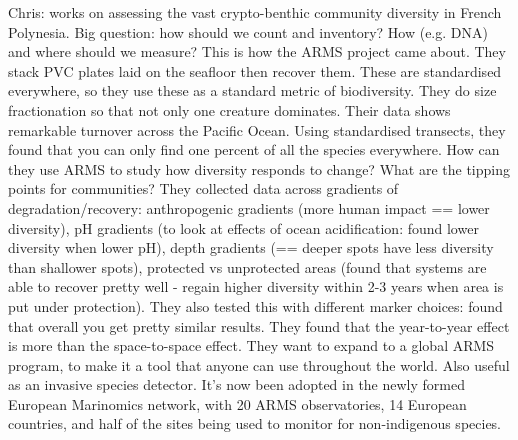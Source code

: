\documentclass[9pt]{article}
\begin{document}
	Chris: works on assessing the vast crypto-benthic community diversity in French Polynesia. Big question: how should we count and inventory? How (e.g. DNA) and where should we measure? This is how the ARMS project came about. They stack PVC plates laid on the seafloor then recover them. These are standardised everywhere, so they use these as a standard metric of biodiversity. They do size fractionation so that not only one creature dominates. Their data shows remarkable turnover across the Pacific Ocean. Using standardised transects, they found that you can only find one percent of all the species everywhere. How can they use ARMS to study how diversity responds to change? What are the tipping points for communities? They collected data across  gradients of degradation/recovery: anthropogenic gradients (more human impact == lower diversity), pH gradients (to look at effects of ocean acidification: found lower diversity when lower pH), depth gradients (== deeper spots have less diversity than shallower spots), protected vs unprotected areas (found that systems are able to recover pretty well - regain higher diversity within 2-3 years when area is put under protection). They also tested this with different marker choices: found that overall you get pretty similar results. They found that the year-to-year effect is more than the space-to-space effect. They want to expand to a global ARMS program, to make it a tool that anyone can use throughout the world. Also useful as an invasive species detector. It's now been adopted in the newly formed European Marinomics network, with 20 ARMS observatories, 14 European countries, and half of the sites being used to monitor for non-indigenous species. 
	
\end{document}
